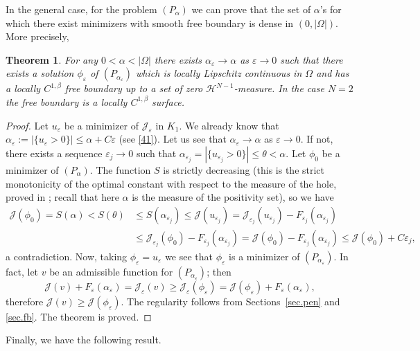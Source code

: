 \documentclass[11pt]{amsart}
\newtheorem{theorem}{Theorem}[section]
\theoremstyle{definition}
\theoremstyle{remark}
\numberwithin{equation}{section}
\newcommand{\cH}{\mathcal{H}}
\newcommand{\cJ}{\mathcal{J}}
\begin{document}
In the general case, for the problem $(P_\alpha)$ we can prove that the set of $\alpha$'s for which there exist minimizers with smooth free boundary is dense in $(0,|\Omega|)$. More precisely,

\begin{theorem}\label{t.dense}
For any $0<\alpha<|\Omega|$ there exists $\alpha_\varepsilon\to\alpha$ as $\varepsilon\to0$ such that there exists a solution $\phi_\varepsilon$ of $(P_{\alpha_\varepsilon})$ which is locally Lipschitz continuous in $\Omega$ and has a locally $C^{1,\beta}$ free boundary up to a set of zero $\cH^{N-1}$-measure. In the case $N=2$ the free boundary is a locally $C^{1,\beta}$ surface.
\end{theorem}

\begin{proof}
Let $u_\varepsilon$ be a minimizer of $\cJ_\varepsilon$ in $K_1$. We already know that $\alpha_\varepsilon:=|\{u_\varepsilon>0\}|\le\alpha+C\varepsilon$ (see \eqref{41}). Let us see that $\alpha_\varepsilon\to\alpha$ as $\varepsilon\to0$. If not, there exists a sequence $\varepsilon_j\to0$ such that $\alpha_{\varepsilon_j}=|\{u_{\varepsilon_j}>0\}|\le\theta<\alpha$. Let $\phi_0$ be a minimizer of $(P_\alpha)$. The function $S$ is strictly decreasing (this is the strict monotonicity of the optimal constant with respect to the measure of the hole, proved in \cite[Section~2]{FBRW1}; recall that here $\alpha$ is the measure of the positivity set), so we have
\begin{align*}
\cJ(\phi_0)=S(\alpha)<S(\theta)&\le S(\alpha_{\varepsilon_j})\le\cJ(u_{\varepsilon_j})=\cJ_{\varepsilon_j}(u_{\varepsilon_j})-F_{\varepsilon_j}(\alpha_{\varepsilon_j})\\
&\le\cJ_{\varepsilon_j}(\phi_0)-F_{\varepsilon_j}(\alpha_{\varepsilon_j})=\cJ(\phi_0)-F_{\varepsilon_j}(\alpha_{\varepsilon_j})\le\cJ(\phi_0)+C\varepsilon_j,
\end{align*}
a contradiction. Now, taking $\phi_\varepsilon=u_\varepsilon$ we see that $\phi_\varepsilon$ is a minimizer of $(P_{\alpha_\varepsilon})$. In fact, let $v$ be an admissible function for $(P_{\alpha_\varepsilon})$; then
\[
\cJ(v)+F_\varepsilon(\alpha_\varepsilon)=\cJ_\varepsilon(v)\ge\cJ_\varepsilon(\phi_\varepsilon)=\cJ(\phi_\varepsilon)+F_\varepsilon(\alpha_\varepsilon),
\]
therefore $\cJ(v)\ge\cJ(\phi_\varepsilon)$. The regularity follows from Sections~\ref{sec.pen} and \ref{sec.fb}. The theorem is proved.
\end{proof}

Finally, we have the following result.
\end{document}
